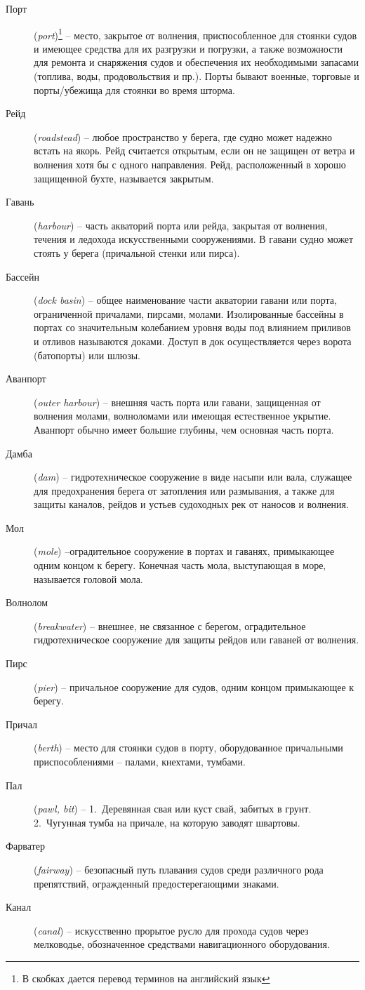 \documentclass[a4paper, 12pt, twoside, final, book, russian, fittopage, cyremdash]{ncc}
\begin{document}
\begin{description}
\item [Порт] (\textit{port})\footnote{В скобках дается перевод терминов на английский язык} \--- место, закрытое от волнения, приспособленное для стоянки судов и имеющее средства для их разгрузки и погрузки, а также возможности для ремонта и снаряжения судов и обеспечения их необходимыми запасами (топлива, воды, продовольствия и пр.). Порты бывают военные, торговые и порты\-/убежища для стоянки во время шторма. 
\item [Рейд] (\textit{roadstead}) \--- любое пространство у берега, где судно может надежно встать на якорь. Рейд считается открытым, если он не защищен от ветра и волнения хотя бы с одного направления. Рейд, расположенный в хорошо защищенной бухте, называется закрытым. 
\item [Гавань] (\textit{harbour}) \--- часть акваторий порта или рейда, закрытая от волнения, течения и ледохода искусственными сооружениями. В гавани судно может стоять у берега (причальной стенки или пирса). 
\item [Бассейн] (\textit{dock basin}) \--- общее наименование части акватории гавани или порта, ограниченной причалами, пирсами, молами. Изолированные бассейны в портах со значительным колебанием уровня воды под влиянием приливов и отливов называются доками. Доступ в док осуществляется через ворота (батопорты) или шлюзы. 
\item [Аванпорт] (\textit{outer harbour}) \--- внешняя часть порта или гавани, защищенная от волнения молами, волноломами или имеющая естественное укрытие. Аванпорт обычно имеет большие глубины, чем основная часть порта. 
\item [Дамба] (\textit{dam}) \--- гидротехническое сооружение в виде насыпи или вала, служащее для предохранения берега от затопления или размывания, а также для защиты каналов, рейдов и устьев судоходных рек от наносов и волнения. 
\item [Мол] (\textit{mole}) \---оградительное сооружение в портах и гаванях, примыкающее одним концом к берегу. Конечная часть мола, выступающая в море, называется головой мола. 
\item [Волнолом] (\textit{breakwater}) \--- внешнее, не связанное с берегом, оградительное гидротехническое сооружение для защиты рейдов или гаваней от волнения. 
\item [Пирс] (\textit{pier}) \--- причальное сооружение для судов, одним концом примыкающее к берегу. 
\item [Причал] (\textit{berth}) \--- место для стоянки судов в порту, оборудованное причальными приспособлениями \--- палами, кнехтами, тумбами. 
\item [Пал] (\textit{pawl, bit}) \--- 1.~Деревянная свая или куст свай, забитых в грунт. 2.~Чугунная тумба на причале, на которую заводят швартовы. 
\item [Фарватер] (\textit{fairway}) \--- безопасный путь плавания судов среди различного рода препятствий, огражденный предостерегающими знаками. 
\item [Канал] (\textit{canal}) \--- искусственно прорытое русло для прохода судов через мелководье, обозначенное средствами навигационного оборудования. 
\end{description}
\end{document}
